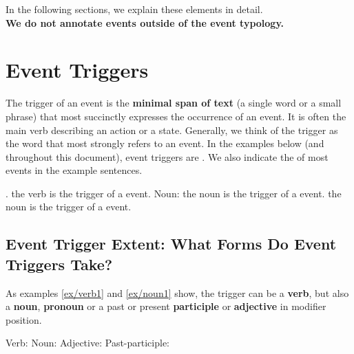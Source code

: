 In the following sections, we explain these elements in detail.\\

\noindent
\textbf{We do not annotate events outside of the event typology.}

\section{Event Triggers}

The trigger of an event is the \textbf{minimal span of text} (a single word or a small phrase) that most succinctly expresses the occurrence of an event.
It is often the main verb describing an action or a state.
Generally, we think of the trigger as the word that most strongly refers to an event.
In the examples below (and throughout this document), event triggers are .
We also indicate the  of most events in the example sentences.

\begin{exe}
    \ex\label{ex/verb1} .
        \expl the verb  is the trigger of a  event.
    \ex\label{ex/noun1} Noun: 
        \expl the noun  is the trigger of a  event.
    \ex\label{ex/noun2} 
        \expl the noun  is the trigger of a  event.
\end{exe}

\subsection{Event Trigger Extent: What Forms Do Event Triggers Take?}
As examples \ref{ex/verb1} and \ref{ex/noun1} show, the trigger can be a \textbf{verb}, but also a \textbf{noun}, \textbf{pronoun} or a past or present \textbf{participle} or \textbf{adjective} in modifier position.

\begin{exe}
    \ex\label{ex/verb2} Verb: 
    \ex\label{ex/noun3} Noun: 
    \ex\label{ex/adjective} Adjective: 
    \ex\label{ex/pastparticiple} Past-participle: 
\end{exe}

